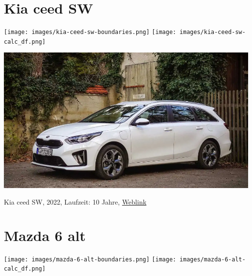 \documentclass[landscape, DIV=99, 14pt]{scrartcl}
\begin{document}
\pagebreak


\twocolumn

\section*{Kia ceed SW}
\begin{center}
\texttt{[image: images/kia-ceed-sw-boundaries.png]}
\null
\vspace{0.5cm}
\texttt{[image: images/kia-ceed-sw-calc\_df.png]}
\end{center}

\pagebreak
\null
\vspace{2cm}
\begin{center}
\includegraphics[width=0.9\columnwidth]{cars/kia-ceed-sportswagon.png}

Kia ceed SW, 2022, Laufzeit: 10 Jahre, \href{https://konfigurator.meinauto.de/kia/neuwagen/cee-d/angebote/cee-d-sporty-wagon/konfigurator/\#!/preisvergleich/platinum/8867329/3,7,18/private/109347-4167-291321/1321/61d21ce73c5db/cash-purchase/109348-8088-291322/48,0,10000,0,0,0,0,0,}{Weblink}
\end{center}

\pagebreak


\twocolumn

\section*{Mazda 6 alt}
\begin{center}
\texttt{[image: images/mazda-6-alt-boundaries.png]}
\null
\vspace{0.5cm}
\texttt{[image: images/mazda-6-alt-calc\_df.png]}
\end{center}
\end{document}
